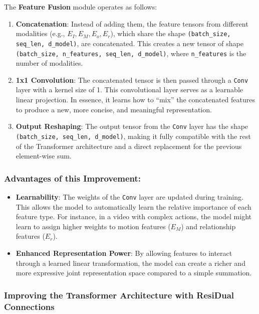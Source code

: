 The \textbf{Feature Fusion} module operates as follows:
\begin{enumerate}[nosep]
    \item \textbf{Concatenation}: Instead of adding them, the feature tensors from different modalities (e.g., $E_I, E_M, E_o, E_r$), which share the shape \texttt{(batch\_size, seq\_len, d\_model)}, are concatenated. This creates a new tensor of shape \texttt{(batch\_size, n\_features, seq\_len, d\_model)}, where \texttt{n\_features} is the number of modalities.
    
    \item \textbf{1x1 Convolution}: The concatenated tensor is then passed through a \texttt{Conv} layer with a kernel size of 1. This convolutional layer serves as a learnable linear projection. In essence, it learns how to ``mix'' the concatenated features to produce a new, more concise, and meaningful representation.
    
    \item \textbf{Output Reshaping}: The output tensor from the \texttt{Conv} layer has the shape \texttt{(batch\_size, seq\_len, d\_model)}, making it fully compatible with the rest of the Transformer architecture and a direct replacement for the previous element-wise sum.
\end{enumerate}

\subsubsection*{Advantages of this Improvement:}
\begin{itemize}[nosep]
    \item \textbf{Learnability}: The weights of the \texttt{Conv} layer are updated during training. This allows the model to automatically learn the relative importance of each feature type. For instance, in a video with complex actions, the model might learn to assign higher weights to motion features ($E_M$) and relationship features ($E_r$).
    
    \item \textbf{Enhanced Representation Power}: By allowing features to interact through a learned linear transformation, the model can create a richer and more expressive joint representation space compared to a simple summation.
\end{itemize}

\subsubsection{Improving the Transformer Architecture with ResiDual Connections}


